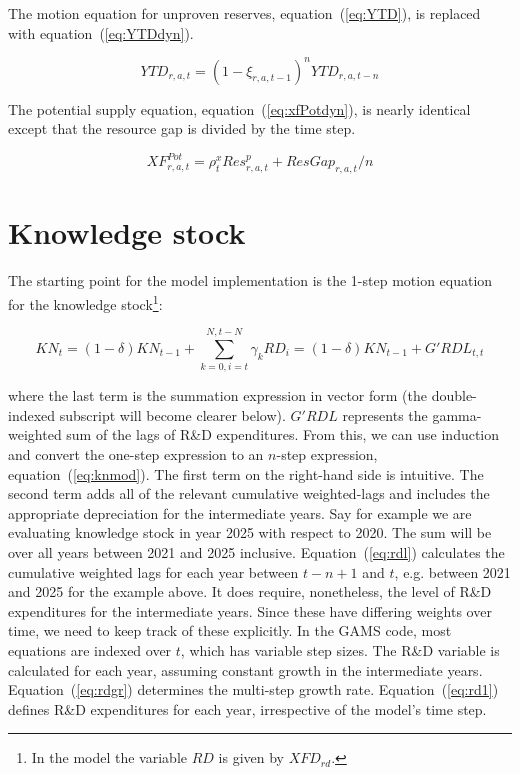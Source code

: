 The motion equation for unproven reserves, equation~(\ref{eq:YTD}),
is replaced with equation~(\ref{eq:YTDdyn}).

\begin{equation}
\label{eq:YTDdyn}
\mathit{YTD}_{r,a,t} = \left( 1 - \xi_{r,a,t-1} \right)^n \mathit{YTD}_{r,a,t-n}
\end{equation}

The potential supply equation, equation~(\ref{eq:xfPotdyn}), is nearly
identical except that the resource gap is divided by the time step.

\begin{equation}
\label{eq:xfPotdyn}
\mathit{XF}^{\mathit{Pot}}_{r,a,t} = \rho^x_t \mathit{Res}^p_{r,a,t} + \mathit{ResGap}_{r,a,t}/n
\end{equation}

\section{Knowledge stock}
\label{sec:knowledge}

The starting point for the model implementation is the 1-step
motion equation for the knowledge stock\footnote{In the 
model the variable $\mathit{RD}$ is given by 
$\mathit{XFD}_{\mathit{rd}}$.}:

\[
\mathit{KN}_{t} = \left(1-\delta \right) \mathit{KN}_{t-1}
+ \sum_{k=0,i=t}^{N,t-N}{\gamma_k \mathit{RD}_{i}} = \left(1-\delta \right) \mathit{KN}_{t-1} + G'\mathit{RDL}_{t,t}
\]

\noindent where the last term is the summation expression in vector
form (the double-indexed subscript will become clearer below). $G'\mathit{RDL}$
represents the gamma-weighted sum of the lags of R\&D expenditures.
From this, we can use induction and convert the one-step expression to
an $n$-step expression, equation~(\ref{eq:knmod}). The first term
on the right-hand side is intuitive. The second term adds all
of the relevant cumulative weighted-lags and includes the
appropriate depreciation for the intermediate years. Say for example
we are evaluating knowledge stock in year 2025 with respect to 2020. The
sum will be over all years between 2021 and 2025 inclusive.
Equation~(\ref{eq:rdl}) calculates the cumulative weighted
lags for each year between $t-n+1$ and $t$, e.g. between
2021 and 2025 for the example above. It does require, nonetheless, the level of R\&D 
expenditures for the intermediate years. Since these have differing weights
over time, we need to keep track of these explicitly.
In the GAMS code, most equations are indexed over $t$,
which has variable step sizes. The R\&D variable is
calculated for each year, assuming constant growth
in the intermediate years. Equation~(\ref{eq:rdgr})
determines the multi-step growth rate. Equation~(\ref{eq:rd1})
defines R\&D expenditures for each year, irrespective
of the model's time step.

